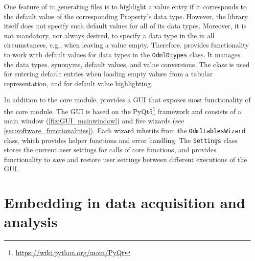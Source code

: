 One feature of  in generating  files is to highlight a value entry if it corresponds to the default value of the corresponding Property's data type. However, the  library itself does not specify such default values for all of its data types. Moreover, it is not mandatory, nor always desired, to specify a data type in the  in all circumstances, e.g., when leaving a value empty. Therefore,  provides functionality to work with default values for data types in the \texttt{OdmlDtypes} class. It manages the data types, synonyms, default values, and value conversions. The class is used for entering default entries when loading empty values from a tabular representation, and for default value highlighting.

In addition to the core module,  provides a GUI that exposes most functionality of the core module. The GUI is based on the PyQt5\footnote{\url{https://wiki.python.org/moin/PyQt}} framework and consists of a main window (\cref{fig:GUI_mainwindow}) and five wizards (see \cref{sec:software_functionalities}). Each wizard inherits from the \texttt{OdmltablesWizard} class, which provides helper functions and error handling. The \texttt{Settings} class stores the current user settings for calls of  core functions, and provides functionality to save and restore user settings between different executions of the GUI.


\section{Embedding  in data acquisition and analysis}
\label{sec:Illustrative-Examples}

